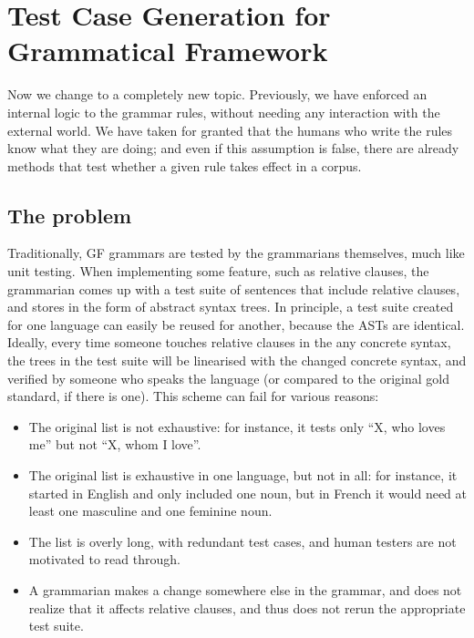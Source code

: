 \def\t#1{\texttt{#1}}


\chapter{Test Case Generation for Grammatical Framework}
\label{chapterGFtest}

Now we change to a completely new topic. 
Previously, we have enforced an internal logic to the grammar rules,
without needing any interaction with the external world. We have taken
for granted that the humans who write the rules know what they are
doing; and even if this assumption is false, there are already methods
that test whether a given rule takes effect in a corpus.


\section{The problem}

Traditionally, GF grammars are tested by the grammarians themselves,
much like unit testing. When implementing some feature, such as 
relative clauses, the grammarian comes up with a test suite of 
sentences that include relative clauses, and stores in the form of 
abstract syntax trees. In principle, a test suite created for one 
language can easily be reused for another, because the ASTs are 
identical. Ideally, every time someone touches relative clauses 
in the any concrete syntax, the trees in the test suite will be 
linearised with the changed concrete syntax, and verified by someone
who speaks the language (or compared to the original gold standard, 
if there is one). This scheme can fail for various reasons: 

\begin{itemize}
\item The original list is not exhaustive: for instance, it tests only
``X, who loves me'' but not ``X, whom I love''. 
\item The original list is exhaustive in one language, but not in all:
for instance, it started in English and only included one noun, but in
French it would need at least one masculine and one feminine noun. 
\item The list is overly long, with redundant test cases, and human
testers are not motivated to read through. 
\item A grammarian makes a change somewhere else in the grammar, and
does not realize that it affects relative clauses, and thus does not
rerun the appropriate test suite. 
\end{itemize}

